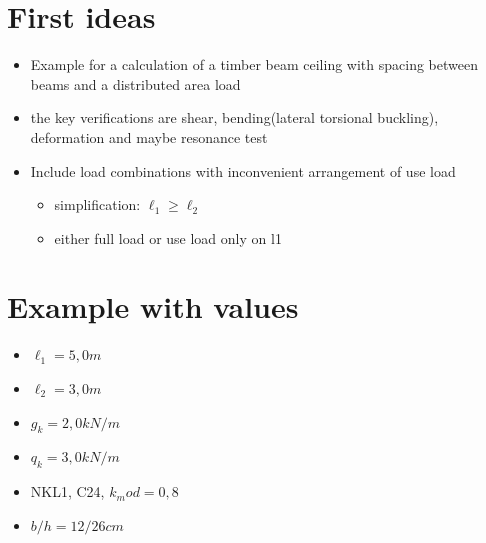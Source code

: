 \documentclass[a4paper]{article}
\begin{document}
\section{First ideas}
\begin{itemize}
    \item Example for a calculation of a timber beam ceiling with spacing between beams and a distributed area load
    \item the key verifications are shear, bending(lateral torsional buckling), deformation and maybe resonance test
    \item Include load combinations with inconvenient arrangement of use load
    \begin{itemize}
        \item simplification: $\ell_1 \ge \ell_2$
        \item either full load or use load only on l1

        \end{itemize}
\end{itemize}

\clearpage
\section{Example with values}
\begin{itemize}
    \item $\ell_1 = 5,0 m  $
    \item $\ell_2 = 3,0 m  $
    \item $g_k = 2,0 kN/m $
    \item $q_k = 3,0 kN/m $
    \item NKL1, C24, $k_mod = 0,8 $
    \item $b/h = 12/26 cm$

\end{itemize}
\end{document}
